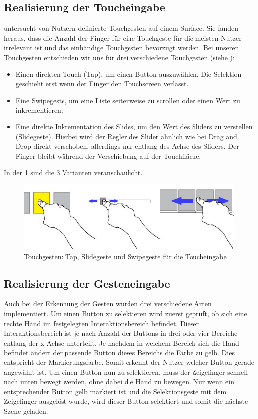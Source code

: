 \subsection[Touch]{Realisierung der Toucheingabe} 
\citet{Wobbrock:2009} untersucht von Nutzern definierte Touchgesten auf einem Surface. 
Sie fanden heraus, dass die Anzahl der Finger für eine Touchgeste für die meisten Nutzer irrelevant ist und das einhändige Touchgesten bevorzugt werden. 
Bei unseren Touchgesten entschieden wir uns für drei verschiedene Touchgesten (siehe ):
\begin{itemize}
\item Einen direkten Touch (Tap), um einen Button auszuwählen. 
Die Selektion geschieht erst wenn der Finger den Touchscreen verlässt. 
\item Eine Swipegeste, um eine Liste seitenweise zu scrollen oder einen Wert zu inkrementieren.
\item Eine direkte Inkrementation des Slides, um den Wert des Sliders zu verstellen (Slidegeste).
Hierbei wird der Regler des Slider ähnlich wie bei Drag and Drop direkt verschoben, allerdings nur entlang des Achse des Sliders.
Der Finger bleibt während der Verschiebung auf der Touchfläche.
\end{itemize}
In der \ref{fig:TouchGestures} sind die 3 Varianten veranschaulicht.
\begin{figure}
	\centering
		\includegraphics[width=1\textwidth]{img/TouchGestures.jpg}
	\caption{Touchgesten: Tap, Slidegeste und Swipegeste für die Toucheingabe}
	\label{fig:TouchGestures}
\end{figure}

\subsection[Geste]{Realisierung der Gesteneingabe}
Auch bei der Erkennung der Gesten wurden drei verschiedene Arten implementiert. 
Um einen Button zu selektieren wird zuerst geprüft, ob sich eine rechte Hand im festgelegten Interaktionsbereich befindet. 
Dieser Interaktionsbereich ist je nach Anzahl der Buttons in drei oder vier Bereiche entlang der x-Achse unterteilt. 
Je nachdem in welchem Bereich sich die Hand befindet ändert der passende Button dieses Bereichs die Farbe zu gelb.
Dies entspricht der Markierungsfarbe. 
Somit erkennt der Nutzer welcher Button gerade angewählt ist. 
Um einen Button nun zu selektieren, muss der Zeigefinger schnell nach unten bewegt werden, ohne dabei die Hand zu bewegen. 
Nur wenn ein entsprechender Button gelb markiert ist und die Selektionsgeste mit dem Zeigefinger ausgelöst wurde, wird dieser Button selektiert und somit die nächste Szene geladen. 

